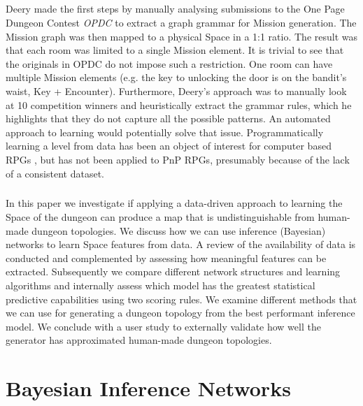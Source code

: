 \documentclass{UoYCSproject}
\begin{document}
\paragraph{}
Deery \parencite{Deery} made the first steps by manually analysing submissions to the One Page Dungeon Contest \textit{OPDC} \parencite{OPDC} to extract a graph grammar for Mission generation. The Mission graph was then mapped to a physical Space in a 1:1 ratio. The result was that each room was limited to a single Mission element. It is trivial to see that the originals in OPDC do not impose such a restriction. One room can have multiple Mission elements (e.g. the key to unlocking the door is on the bandit’s waist, Key + Encounter). Furthermore, Deery’s approach was to manually look at 10 competition winners and heuristically extract the grammar rules, which he highlights that they do not capture all the possible patterns. An automated approach to learning would potentially solve that issue. Programmatically learning a level from data has been an object of interest for computer based RPGs \parencite{SummervilleLearningOfZelda}, but has not been applied to PnP RPGs, presumably because of the lack of a consistent dataset.

\paragraph{}
In this paper we investigate if applying a data-driven approach to learning the Space of the dungeon can produce a map that is undistinguishable from human-made dungeon topologies. We discuss how we can use inference (Bayesian) networks to learn Space features from data. A review of the availability of data is conducted and complemented by assessing how meaningful features can be extracted. Subsequently we compare different network structures and learning algorithms and internally assess which model has the greatest statistical predictive capabilities using two scoring rules. We examine different methods that we can use for generating a dungeon topology from the best performant inference model. We conclude with a user study to externally validate how well the generator has approximated human-made dungeon topologies.

\chapter{Bayesian Inference Networks}
\label{ch:BNETS}
\end{document}
